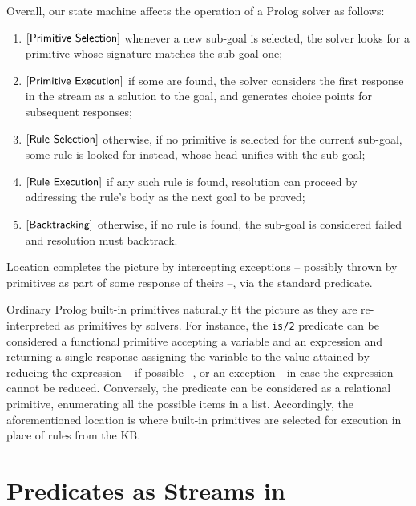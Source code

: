 \documentclass[12pt,a4paper,openright,twoside]{book}
\begin{document}
Overall, our state machine affects the operation of a Prolog solver as follows:
%
\begin{enumerate}
    \item $\left[\textsf{Primitive Selection}\right]$ whenever a new sub-goal is selected, the solver looks for a primitive whose signature matches the sub-goal one;

    \item $\left[\textsf{Primitive Execution}\right]$ if some are found, the solver considers the first response in the stream as a solution to the goal, and generates choice points for subsequent responses;

    \item $\left[\textsf{Rule Selection}\right]$ otherwise, if no primitive is selected for the current sub-goal, some rule is looked for instead, whose head unifies with the sub-goal;

    \item $\left[\textsf{Rule Execution}\right]$ if any such rule is found, resolution can proceed by addressing the rule's body as the next goal to be proved;

    \item $\left[\textsf{Backtracking}\right]$ otherwise, if no rule is found, the sub-goal is considered failed and resolution must backtrack.
\end{enumerate}
%
Location  completes the picture by intercepting exceptions -- possibly thrown by primitives as part of some response of theirs --, via the standard  predicate.

Ordinary Prolog built-in primitives naturally fit the picture as they are re-interpreted as  primitives by solvers.
%
For instance, the \texttt{is/2} predicate can be considered a functional primitive accepting a variable and an expression and returning a single response assigning the variable to the value attained by reducing the expression -- if possible --, or an exception---in case the expression cannot be reduced.
%
Conversely, the  predicate can be considered as a relational primitive, enumerating all the possible items in a list.
%
Accordingly, the aforementioned  location is where built-in primitives are selected for execution in place of rules from the KB.

\section{Predicates as Streams in \twopkt{}}
\end{document}
